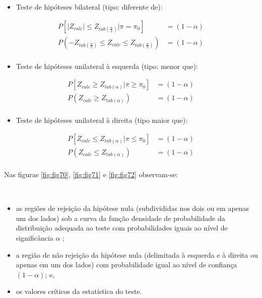 \documentclass[
]{book}
\providecommand{\tightlist}{%
  \setlength{\itemsep}{0pt}\setlength{\parskip}{0pt}}
\begin{document}
\hfill\break

\begin{itemize}
\tightlist
\item
  Teste de hipóteses bilateral (tipo: diferente de):
\end{itemize}

\hfill\break

\begin{align*}
P[\left|Z_{calc}\right| \le {Z}_{tab\left(\frac{\alpha }{2}\right)}|\pi= \pi_{0}] & =(1-\alpha) \\
P( -{Z}_{tab\left(\frac{\alpha }{2}\right)} \le Z_{calc} \le {Z}_{tab\left(\frac{\alpha }{2}\right)} ) & =(1-\alpha)\\
\end{align*}

\hfill\break

\begin{itemize}
\tightlist
\item
  Teste de hipóteses unilateral à esquerda (tipo: menor que):
\end{itemize}

\hfill\break

\begin{align*}
P[Z_{calc} \ge  {Z}_{tab\left(\alpha \right)}|\pi \ge \pi_{0}] & =(1-\alpha)\\  
P( Z_{calc}  \ge  {Z}_{tab\left(\alpha \right)}) & = (1-\alpha)\\ 
\end{align*}

\hfill\break

\begin{itemize}
\tightlist
\item
  Teste de hipóteses unilateral à direita (tipo maior que):
\end{itemize}

\hfill\break

\begin{align*}
P[Z_{calc} \le  {Z}_{tab\left(\alpha \right)}|\pi \le \pi_{0}] & =(1-\alpha)\\  
P( Z_{calc}  \le  {Z}_{tab\left(\alpha \right)}) & = (1-\alpha)\\
\end{align*}

\hfill\break

Nas figuras \ref{fig:fig70}, \ref{fig:fig71} e \ref{fig:fig72} observam-se:

~

\begin{itemize}
\tightlist
\item
  as regiões de rejeição da hipótese nula (subdivididas nos dois ou em apenas um dos lados) sob a curva da função densidade de probabilidade da distribuição adequada ao teste com probabilidades iguais ao nível de significância \(\alpha\) ;\\
\item
  a região de não rejeição da hipótese nula (delimitada à esquerda e à direita ou apenas em um dos lados) com probabilidade igual ao nível de confiança \((1-\alpha)\); e,\\
\item
  os valores críticos da estatística do teste.
\end{itemize}
\end{document}
